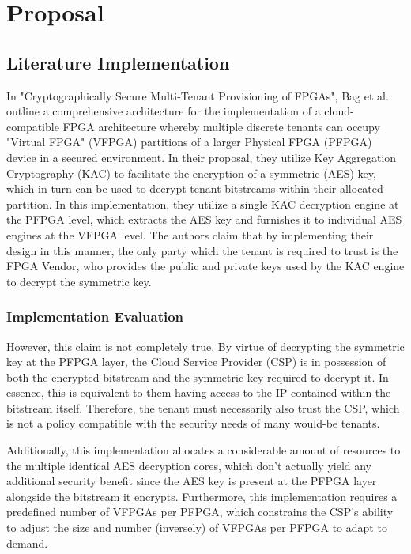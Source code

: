 \chapter{Proposal}\label{chap:Proposal}
\section{Literature Implementation}\label{sec:LitImpl}

In "Cryptographically Secure Multi-Tenant Provisioning of FPGAs", Bag et al. outline a comprehensive architecture for the implementation of a cloud-compatible FPGA architecture whereby multiple discrete tenants can occupy "Virtual FPGA" (VFPGA) partitions of a larger Physical FPGA (PFPGA) device in a secured environment. In their proposal, they utilize Key Aggregation Cryptography (KAC) to facilitate the encryption of a symmetric (AES) key, which in turn can be used to decrypt tenant bitstreams within their allocated partition. In this implementation, they utilize a single KAC decryption engine at the PFPGA level, which extracts the AES key and furnishes it to individual AES engines at the VFPGA level. The authors claim that by implementing their design in this manner, the only party which the tenant is required to trust is the FPGA Vendor, who provides the public and private keys used by the KAC engine to decrypt the symmetric key.

\subsection{Implementation Evaluation}\label{subsec:LitEval}

However, this claim is not completely true. By virtue of decrypting the symmetric key at the PFPGA layer, the Cloud Service Provider (CSP) is in possession of both the encrypted bitstream and the symmetric key required to decrypt it. In essence, this is equivalent to them having access to the IP contained within the bitstream itself. Therefore, the tenant must necessarily also trust the CSP, which is not a policy compatible with the security needs of many would-be tenants.

Additionally, this implementation allocates a considerable amount of resources to the multiple identical AES decryption cores, which don't actually yield any additional security benefit since the AES key is present at the PFPGA layer alongside the bitstream it encrypts. Furthermore, this implementation requires a predefined number of VFPGAs per PFPGA, which constrains the CSP's ability to adjust the size and number (inversely) of VFPGAs per PFPGA to adapt to demand.

